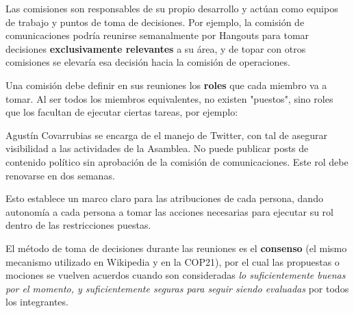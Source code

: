 \documentclass[justified]{tufte-handout} %
\begin{document}
Las comisiones son responsables de su propio desarrollo y actúan como equipos de trabajo y puntos de toma de decisiones. Por ejemplo, la comisión de comunicaciones podría reunirse semanalmente por Hangouts para tomar decisiones \textbf{exclusivamente relevantes} a su área, y de topar con otros comisiones se elevaría esa decisión hacia la comisión de operaciones.

Una comisión debe definir en sus reuniones los \textbf{roles} que cada miembro va a tomar. Al ser todos los miembros equivalentes, no existen "puestos", sino roles que los facultan de ejecutar ciertas tareas, por ejemplo:
\begin{displayquote}
	Agustín Covarrubias se encarga de el manejo de Twitter, con tal de asegurar visibilidad a las actividades de la Asamblea. No puede publicar posts de contenido político sin aprobación de la comisión de comunicaciones. Este rol debe renovarse en dos semanas.
\end{displayquote}

Esto establece un marco claro para las atribuciones de cada persona, dando autonomía a cada persona a tomar las acciones necesarias para ejecutar su rol dentro de las restricciones puestas.

El método de toma de decisiones durante las reuniones es el \textbf{consenso} (el mismo mecanismo utilizado en Wikipedia y en la COP21), por el cual las propuestas o mociones se vuelven acuerdos cuando son consideradas \textit{lo suficientemente buenas por el momento, y suficientemente seguras para seguir
siendo evaluadas} por todos los integrantes. 
\end{document}

